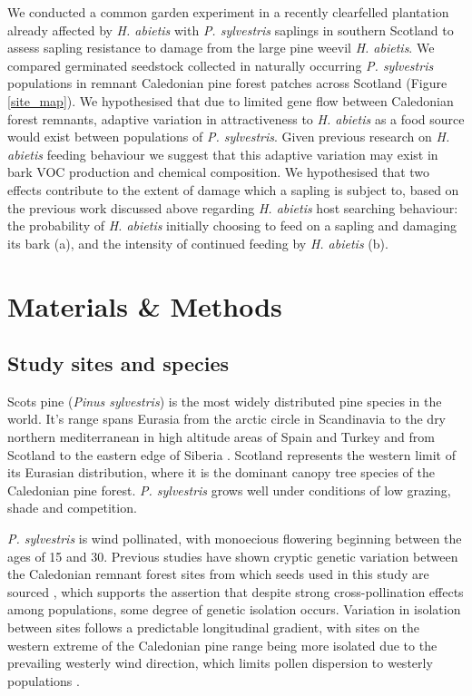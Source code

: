 \documentclass[a4paper, 11pt]{article}
\begin{document}
We conducted a common garden experiment in a recently clearfelled plantation already affected by \textit{H. abietis} with \textit{P. sylvestris} saplings in southern Scotland to assess sapling resistance to damage from the large pine weevil \textit{H. abietis}. We compared germinated seedstock collected in naturally occurring \textit{P. sylvestris} populations in remnant Caledonian pine forest patches across Scotland (Figure \ref{site_map}). We hypothesised that due to limited gene flow between Caledonian forest remnants, adaptive variation in attractiveness to \textit{H. abietis} as a food source would exist between populations of \textit{P. sylvestris}. Given previous research on \textit{H. abietis} feeding behaviour we suggest that this adaptive variation may exist in bark VOC production and chemical composition. We hypothesised that two effects contribute to the extent of damage which a sapling is subject to, based on the previous work discussed above regarding \textit{H. abietis} host searching behaviour: the probability of \textit{H. abietis} initially choosing to feed on a sapling and damaging its bark (a), and the intensity of continued feeding by \textit{H. abietis} (b). 

\section*{Materials \& Methods}

\subsection*{Study sites and species}

Scots pine (\textit{Pinus sylvestris}) is the most widely distributed pine species in the world. It's range spans Eurasia from the arctic circle in Scandinavia to the dry northern mediterranean in high altitude areas of Spain and Turkey and from Scotland to the eastern edge of Siberia \citep{GBIF2019, Carlisle1968}. Scotland represents the western limit of its Eurasian distribution, where it is the dominant canopy tree species of the Caledonian pine forest. \textit{P. sylvestris} grows well under conditions of low grazing, shade and competition. 

\textit{P. sylvestris} is wind pollinated, with monoecious flowering beginning between the ages of 15 and 30. Previous studies have shown cryptic genetic variation between the Caledonian remnant forest sites from which seeds used in this study are sourced \citep{Donnelly2018}, which supports the assertion that despite strong cross-pollination effects among populations, some degree of genetic isolation occurs. Variation in isolation between sites follows a predictable longitudinal gradient, with sites on the western extreme of the Caledonian pine range being more isolated due to the prevailing westerly wind direction, which limits pollen dispersion to westerly populations \citep{Gonzalez2018}. 
\end{document}

